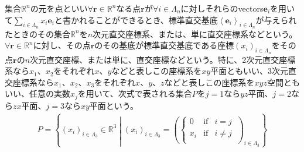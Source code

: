 \documentclass[dvipdfmx]{jsarticle}
\begin{document}
\begin{dfn}
集合$\mathbb{R}^{n}$の元を点といい$\forall\mathbf{r} \in \mathbb{R}^{n}$なる点$\mathbf{r}$が$\forall i \in \varLambda_{n}$に対しそれらのvectors$\mathbf{e}_{i}$を用いて$\sum_{i \in \varLambda_{n}} {x_{i}\mathbf{e}_{i}}$と書かれることができるとき、標準直交基底$\left\langle \mathbf{e}_{i} \right\rangle_{i \in \varLambda_{n}}$が与えられたときのその集合$\mathbb{R}^{n}$を$n$次元直交座標系、または、単に直交座標系などという。$\forall\mathbf{r} \in \mathbb{R}^{n}$に対し、その点$\mathbf{r}$のその基底が標準直交基底である座標$\left( x_{i} \right)_{i \in \varLambda_{n}}$をその点$\mathbf{r}$の$n$次元直交座標、または単に、直交座標などという。特に、2次元直交座標系なら$x_{1}$、$x_{2}$をそれぞれ$x$、$y$などと表しこの座標系を$xy$平面ともいい、3次元直交座標系なら$x_{1}$、$x_{2}$、$x_{3}$をそれぞれ$x$、$y$、$z$などと表しこの座標系を$xyz$空間ともいい、任意の実数$x_{j}$を用いて、次式で表される集合$P$を$j = 1$なら$yz$平面、$j = 2$なら$zx$平面、$j = 3$なら$xy$平面という。
\begin{align*}
P = \left\{ \left( x_{i} \right)_{i \in \varLambda_{3}} \in \mathbb{R}^{3} \middle| \left( x_{i} \right)_{i \in \varLambda_{3}} = \left( \left\{ \begin{matrix}
0 & \mathrm{if} & i = j \\
x_{i} & \mathrm{if} & i \neq j \\
\end{matrix} \right.\  \right)_{i \in \varLambda_{3}} \right\}
\end{align*}
\end{dfn}
\end{document}
